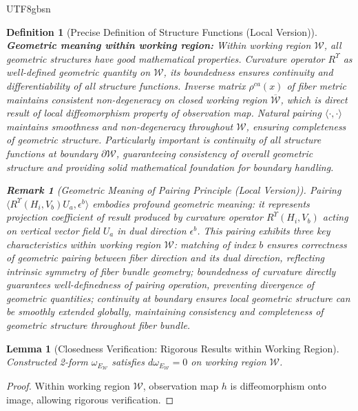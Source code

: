 \documentclass[a4paper,12pt]{extarticle}
\newtheorem{lemma}[theorem]{Lemma}
\newtheorem{definition}{Definition}
\theoremstyle{definition}
\newtheorem{remark}{Remark}
\begin{document}
\begin{CJK}{UTF8}{gbsn}
\begin{definition}[Precise Definition of Structure Functions (Local Version)]
\textbf{Geometric meaning within working region:}
Within working region $\mathcal{W}$, all geometric structures have good mathematical properties. Curvature operator $R^{\Upsilon}$ as well-defined geometric quantity on $\mathcal{W}$, its boundedness ensures continuity and differentiability of all structure functions. Inverse matrix $\rho^{ca}(x)$ of fiber metric maintains consistent non-degeneracy on closed working region $\overline{\mathcal{W}}$, which is direct result of local diffeomorphism property of observation map. Natural pairing $\langle \cdot, \cdot \rangle$ maintains smoothness and non-degeneracy throughout $\mathcal{W}$, ensuring completeness of geometric structure. Particularly important is continuity of all structure functions at boundary $\partial \mathcal{W}$, guaranteeing consistency of overall geometric structure and providing solid mathematical foundation for boundary handling.

\begin{remark}[Geometric Meaning of Pairing Principle (Local Version)]
Pairing $\langle R^{\Upsilon}(H_i, V_b)U_a, \epsilon^b \rangle$ embodies profound geometric meaning: it represents projection coefficient of result produced by curvature operator $R^{\Upsilon}(H_i, V_b)$ acting on vertical vector field $U_a$ in dual direction $\epsilon^b$. This pairing exhibits three key characteristics within working region $\mathcal{W}$: matching of index $b$ ensures correctness of geometric pairing between fiber direction and its dual direction, reflecting intrinsic symmetry of fiber bundle geometry; boundedness of curvature directly guarantees well-definedness of pairing operation, preventing divergence of geometric quantities; continuity at boundary ensures local geometric structure can be smoothly extended globally, maintaining consistency and completeness of geometric structure throughout fiber bundle.
\end{remark}


\end{definition}

\begin{lemma}[Closedness Verification: Rigorous Results within Working Region]
Constructed 2-form $\omega_{E_{\mathcal{W}}}$ satisfies $d\omega_{E_{\mathcal{W}}} = 0$ on working region $\mathcal{W}$.
\end{lemma}

\begin{proof}
Within working region $\mathcal{W}$, observation map $h$ is diffeomorphism onto image, allowing rigorous verification.


\end{proof}
\end{CJK}
\end{document}
